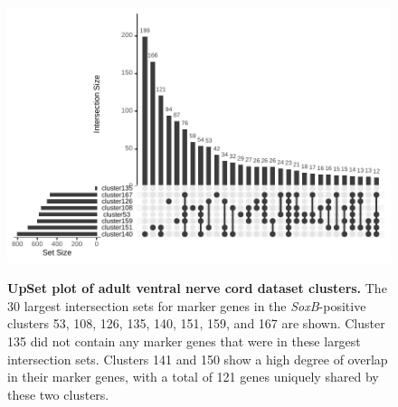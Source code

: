 \documentclass[withindex,glossary]{cam-thesis}
\begin{document}
\setcounter{figure}{25-1}
\begin{figure}[htb]
\centering
\includegraphics[width=\linewidth]{figs/Fig25 Allen upset adhoc.pdf}
\label{fig25}
\caption{\textbf{UpSet plot of adult ventral nerve cord dataset clusters.} The 30 largest intersection sets for marker genes in the \emph{SoxB}-positive clusters 53, 108, 126, 135, 140, 151, 159, and 167 are shown. Cluster 135 did not contain any marker genes that were in these largest intersection sets. Clusters 141 and 150 show a high degree of overlap in their marker genes, with a total of 121 genes uniquely shared by these two clusters.}
\end{figure}
\end{document}
